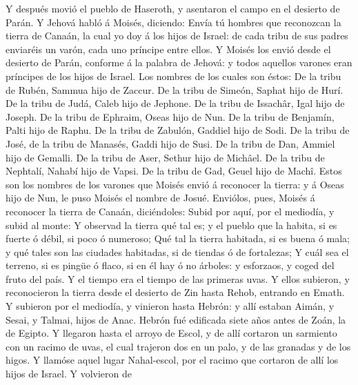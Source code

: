  Y después movió el pueblo de Haseroth, y asentaron el
campo en el desierto de Parán.  Y Jehová habló á Moisés,
diciendo:  Envía tú hombres que reconozcan la tierra de
Canaán, la cual yo doy á los hijos de Israel: de cada tribu de sus
padres enviaréis un varón, cada uno príncipe entre ellos. 
Y Moisés los envió desde el desierto de Parán, conforme á la palabra de
Jehová: y todos aquellos varones eran príncipes de los hijos de Israel.
 Los nombres de los cuales son éstos: De la tribu de
Rubén, Sammua hijo de Zaccur.  De la tribu de Simeón,
Saphat hijo de Hurí.  De la tribu de Judá, Caleb hijo de
Jephone.  De la tribu de Issachâr, Igal hijo de Joseph.
 De la tribu de Ephraim, Oseas hijo de Nun.
 De la tribu de Benjamín, Palti hijo de Raphu.
 De la tribu de Zabulón, Gaddiel hijo de Sodi.
 De la tribu de José, de la tribu de Manasés, Gaddi hijo
de Susi.  De la tribu de Dan, Ammiel hijo de Gemalli.
 De la tribu de Aser, Sethur hijo de Michâel.
 De la tribu de Nephtalí, Nahabí hijo de Vapsi.
 De la tribu de Gad, Geuel hijo de Machî. 
Estos son los nombres de los varones que Moisés envió á reconocer la
tierra: y á Oseas hijo de Nun, le puso Moisés el nombre de Josué.
 Enviólos, pues, Moisés á reconocer la tierra de Canaán,
diciéndoles: Subid por aquí, por el mediodía, y subid al monte:
 Y observad la tierra qué tal es; y el pueblo que la
habita, si es fuerte ó débil, si poco ó numeroso;  Qué
tal la tierra habitada, si es buena ó mala; y qué tales son las ciudades
habitadas, si de tiendas ó de fortalezas;  Y cuál sea el
terreno, si es pingüe ó flaco, si en él hay ó no árboles: y esforzaos, y
coged del fruto del país. Y el tiempo era el tiempo de las primeras
uvas.  Y ellos subieron, y reconocieron la tierra desde
el desierto de Zin hasta Rehob, entrando en Emath.  Y
subieron por el mediodía, y vinieron hasta Hebrón: y allí estaban Aimán,
y Sesai, y Talmai, hijos de Anac. Hebrón fué edificada siete años antes
de Zoán, la de Egipto.  Y llegaron hasta el arroyo de
Escol, y de allí cortaron un sarmiento con un racimo de uvas, el cual
trajeron dos en un palo, y de las granadas y de los higos.
 Y llamóse aquel lugar Nahal-escol, por el racimo que
cortaron de allí los hijos de Israel.  Y volvieron de
